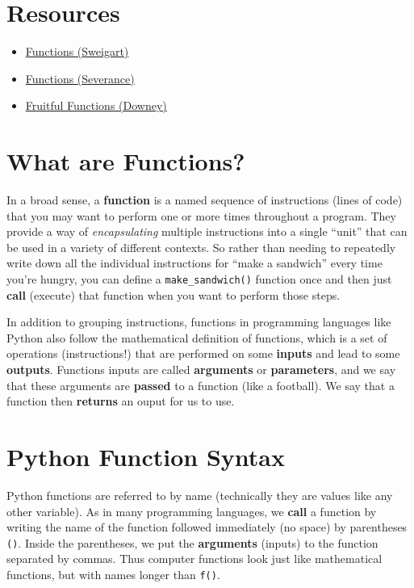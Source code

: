 \documentclass[]{book}
\providecommand{\tightlist}{%
  \setlength{\itemsep}{0pt}\setlength{\parskip}{0pt}}
\begin{document}
\hypertarget{resources}{\section{Resources}\label{resources}}

\begin{itemize}
\tightlist
\item
  \href{https://automatetheboringstuff.com/chapter3/}{Functions
  (Sweigart)}
\item
  \href{https://books.trinket.io/pfe/04-functions.html}{Functions
  (Severance)}
\item
  \href{http://openbookproject.net/thinkcs/python/english3e/fruitful_functions.html}{Fruitful
  Functions (Downey)} 
\end{itemize}

\hypertarget{what-are-functions}{\section{What are
Functions?}\label{what-are-functions}}

In a broad sense, a \textbf{function} is a named sequence of
instructions (lines of code) that you may want to perform one or more
times throughout a program. They provide a way of \emph{encapsulating}
multiple instructions into a single ``unit'' that can be used in a
variety of different contexts. So rather than needing to repeatedly
write down all the individual instructions for ``make a sandwich'' every
time you're hungry, you can define a \texttt{make\_sandwich()} function
once and then just \textbf{call} (execute) that function when you want
to perform those steps.

In addition to grouping instructions, functions in programming languages
like Python also follow the mathematical definition of functions, which
is a set of operations (instructions!) that are performed on some
\textbf{inputs} and lead to some \textbf{outputs}. Functions inputs are
called \textbf{arguments} or \textbf{parameters}, and we say that these
arguments are \textbf{passed} to a function (like a football). We say
that a function then \textbf{returns} an ouput for us to use.

\hypertarget{python-function-syntax}{\section{Python Function
Syntax}\label{python-function-syntax}}

Python functions are referred to by name (technically they are values
like any other variable). As in many programming languages, we
\textbf{call} a function by writing the name of the function followed
immediately (no space) by parentheses \texttt{()}. Inside the
parentheses, we put the \textbf{arguments} (inputs) to the function
separated by commas. Thus computer functions look just like mathematical
functions, but with names longer than \texttt{f()}.
\end{document}
